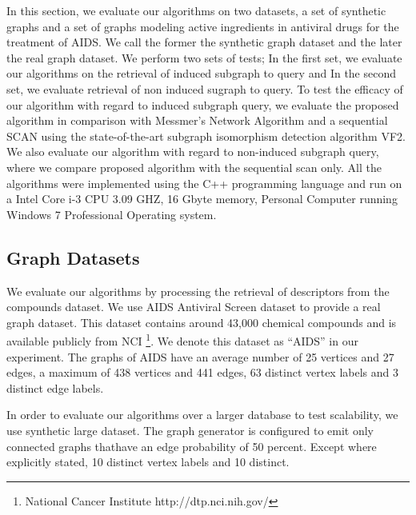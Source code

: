 In this section, we evaluate our algorithms on two datasets, a set of synthetic graphs and a set of graphs modeling active ingredients in antiviral drugs for the 
treatment of AIDS. We call the former the synthetic graph dataset and the later the real graph dataset. We perform two sets of tests; In the first set, we evaluate 
our algorithms on the retrieval of induced subgraph to query and In the second set, we evaluate retrieval of non induced sugraph to query.  To test the efficacy 
of our algorithm with regard to induced subgraph query, we evaluate the proposed algorithm in comparison with Messmer's Network Algorithm and a sequential SCAN 
using the state-of-the-art subgraph isomorphism detection algorithm VF2\cite{cordella2001_vf2}.
We also evaluate our algorithm with regard to non-induced subgraph query, where we compare proposed algorithm with the sequential scan only.
All the algorithms were implemented using the C++ programming language and run on a Intel Core i-3 CPU 3.09 GHZ, 16 Gbyte memory, Personal Computer running 
Windows 7 Professional Operating system.

\subsection{Graph Datasets}
We evaluate our algorithms by processing the retrieval of descriptors from the compounds dataset.
We use AIDS Antiviral Screen dataset to provide a real graph dataset.
This dataset contains around 43,000 chemical compounds and is available publicly from NCI
\footnote{National Cancer Institute http://dtp.nci.nih.gov/}.
We denote this dataset as ``AIDS'' in our experiment.
The graphs of AIDS have an average number of 25 vertices and 27 edges, a maximum of 438 vertices and 441 edges,
63 distinct vertex labels and 3 distinct edge labels.

In order to evaluate our algorithms over a larger database to test scalability, we use synthetic large dataset. The graph generator is configured to emit only connected graphs thathave an edge probability of 50 percent. Except where explicitly stated, 10 distinct vertex labels and 10 distinct.


